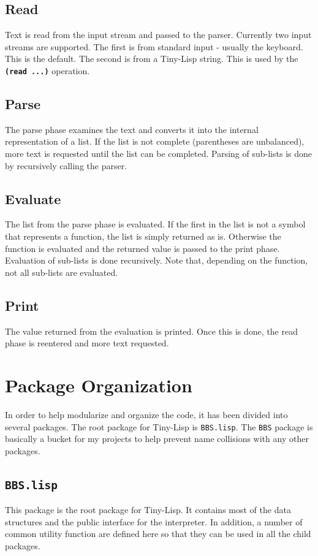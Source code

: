 \documentclass[10pt, openany]{book}
\newcommand{\operation}[1]{\textbf{\texttt{#1}}}
\newcommand{\package}[1]{\texttt{#1}}
\newcommand{\tl}{Tiny-Lisp}
\begin{document}
\subsection{Read}
Text is read from the input stream and passed to the parser.  Currently two input streams are supported.  The first is from standard input - usually the keyboard.  This is the default.  The second is from a \tl{} string.  This is used by the \operation{(read ...)} operation.

\subsection{Parse}
The parse phase examines the text and converts it into the internal representation of a list.  If the list is not complete (parentheses are unbalanced), more text is requested until the list can be completed.  Parsing of sub-lists is done by recursively calling the parser.

\subsection{Evaluate}
The list from the parse phase is evaluated.  If the first in the list is not a symbol that represents a function, the list is simply returned as is.  Otherwise the function is evaluated and the returned value is passed to the print phase.  Evaluation of sub-lists is done recursively.  Note that, depending on the function, not all sub-lists are evaluated.

\subsection{Print}
The value returned from the evaluation is printed.  Once this is done, the read phase is reentered and more text requested.

\section{Package Organization}
In order to help modularize and organize the code, it has been divided into several packages.  The root package for \tl{} is \package{BBS.lisp}.  The \package{BBS} package is basically a bucket for my projects to help prevent name collisions with any other packages.

\subsection{\package{BBS.lisp}}
This package is the root package for \tl{}.  It contains most of the data structures and the public interface for the interpreter.  In addition, a number of common utility function are defined here so that they can be used in all the child packages.
\end{document}
